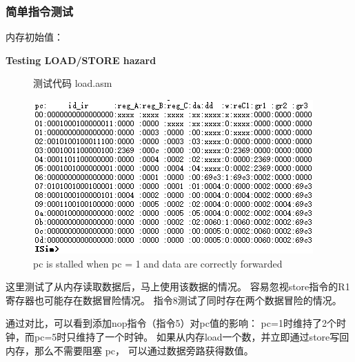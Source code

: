 \documentclass[10pt,a4paper,fleqn]{article}
\begin{document}
\subsubsection{简单指令测试}
内存初始值：
\begin{flushleft}
  \begin{minipage}{0.3\textwidth}
    
  \end{minipage}
\end{flushleft}
\newpage
\par {\bf Testing LOAD/STORE hazard}
\begin{figure}[H]
  \begin{minipage}{0.3\textwidth}
    测试代码 load.asm
    
  \end{minipage}
  \hspace{1em}
  \begin{minipage}{0.65\textwidth}
    \centering
    \includegraphics[width=\textwidth]{figure/simu/loadtest.png}
    \caption{pc is stalled when pc = 1 and  data are correctly forwarded}
  \end{minipage}
\end{figure}
\par 这里测试了从内存读取数据后，马上使用该数据的情况。
容易忽视store指令的R1寄存器也可能存在数据冒险情况。
指令8测试了同时存在两个数据冒险的情况。
\par
通过对比，可以看到添加nop指令（指令5）对pc值的影响：
pc=1时维持了2个时钟，而pc=5时只维持了一个时钟。
如果从内存load一个数，并立即通过store写回内存，那么不需要阻塞 pc，
可以通过数据旁路获得数值。
\end{document}
